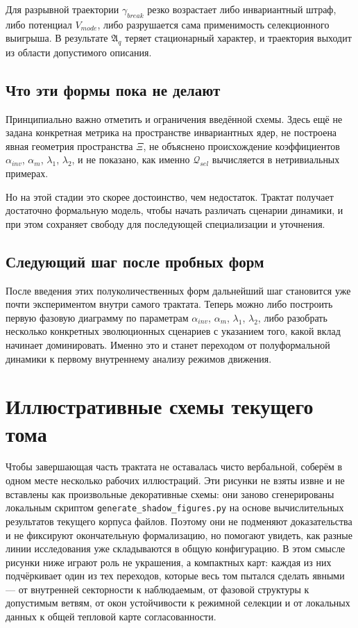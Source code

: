 \documentclass[12pt,a4paper]{article}
\begin{document}
Для разрывной траектории \(\gamma_{break}\) резко возрастает либо инвариантный штраф, либо потенциал \(V_{mode}\), либо разрушается сама применимость селекционного выигрыша. В результате \(\mathfrak{A}_{q}\) теряет стационарный характер, и траектория выходит из области допустимого описания.

\subsection{Что эти формы пока не делают}

Принципиально важно отметить и ограничения введённой схемы. Здесь ещё не задана конкретная метрика на пространстве инвариантных ядер, не построена явная геометрия пространства \(\Xi\), не объяснено происхождение коэффициентов \(\alpha_{inv}\), \(\alpha_{m}\), \(\lambda_1\), \(\lambda_2\), и не показано, как именно \(\mathcal{Q}_{sel}\) вычисляется в нетривиальных примерах.

Но на этой стадии это скорее достоинство, чем недостаток. Трактат получает достаточно формальную модель, чтобы начать различать сценарии динамики, и при этом сохраняет свободу для последующей специализации и уточнения.

\subsection{Следующий шаг после пробных форм}

После введения этих полуколичественных форм дальнейший шаг становится уже почти экспериментом внутри самого трактата. Теперь можно либо построить первую фазовую диаграмму по параметрам \(\alpha_{inv}\), \(\alpha_{m}\), \(\lambda_1\), \(\lambda_2\), либо разобрать несколько конкретных эволюционных сценариев с указанием того, какой вклад начинает доминировать. Именно это и станет переходом от полуформальной динамики к первому внутреннему анализу режимов движения.

\section{Иллюстративные схемы текущего тома}

Чтобы завершающая часть трактата не оставалась чисто вербальной, соберём в одном месте несколько рабочих иллюстраций. Эти рисунки не взяты извне и не вставлены как произвольные декоративные схемы: они заново сгенерированы локальным скриптом \texttt{generate\_shadow\_figures.py} на основе вычислительных результатов текущего корпуса файлов. Поэтому они не подменяют доказательства и не фиксируют окончательную формализацию, но помогают увидеть, как разные линии исследования уже складываются в общую конфигурацию. В этом смысле рисунки ниже играют роль не украшения, а компактных карт: каждая из них подчёркивает один из тех переходов, которые весь том пытался сделать явными --- от внутренней секторности к наблюдаемым, от фазовой структуры к допустимым ветвям, от окон устойчивости к режимной селекции и от локальных данных к общей тепловой карте согласованности.
\end{document}
